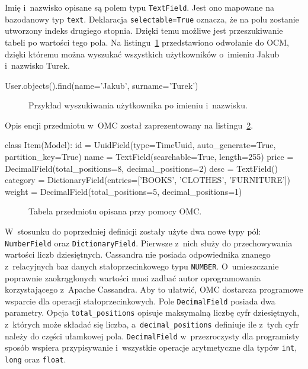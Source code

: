 Imię i~nazwisko opisane są polem typu \verb+TextField+. Jest ono mapowane na bazodanowy typ \verb+text+. Deklaracja \verb+selectable=True+ oznacza, że na polu zostanie utworzony indeks drugiego stopnia. Dzięki temu możliwe jest przeszukiwanie tabeli po wartości tego pola. Na listingu~\ref{lst:user_search_by_name_surname} przedstawiono odwołanie do OCM, dzięki któremu można wyszukać wszystkich użytkowników o~imieniu Jakub i~nazwisko Turek.

\begin{verbbox}[\footnotesize]
	User.objects().find(name='Jakub', surname='Turek')
\end{verbbox}

\begin{figure}[ht!]
	\centering
	\theverbbox
	\caption{Przykład wyszukiwania użytkownika po imieniu i~nazwisku.}
	\label{lst:user_search_by_name_surname}
\end{figure}

Opis encji przedmiotu w~OMC został zaprezentowany na listingu~\ref{lst:omc_item_definition}. 

\begin{verbbox}[\footnotesize]
class Item(Model):
    id = UuidField(type=TimeUuid, auto_generate=True, partition_key=True)
    name = TextField(searchable=True, length=255)
    price = DecimalField(total_positions=8, decimal_positions=2)
    desc = TextField()
    category = DictionaryField(entries=['BOOKS', 'CLOTHES', 'FURNITURE'])
    weight = DecimalField(total_positions=5, decimal_positions=1)
\end{verbbox}

\begin{figure}[ht!]
	\centering
	\theverbbox
	\caption{Tabela przedmiotu opisana przy pomocy OMC.}
	\label{lst:omc_item_definition}
\end{figure}

W~stosunku do poprzedniej definicji zostały użyte dwa nowe typy pól: \verb+NumberField+ oraz \verb+DictionaryField+. Pierwsze z~nich służy do przechowywania wartości liczb dziesiętnych. Cassandra nie posiada odpowiednika znanego z~relacyjnych baz danych stałoprzecinkowego typu \verb+NUMBER+. O~umieszczanie poprawnie zaokrąglonych wartości musi zadbać autor oprogramowania korzystającego z~Apache Cassandra. Aby to ułatwić, OMC dostarcza programowe wsparcie dla operacji stałoprzecinkowych. Pole \verb+DecimalField+ posiada dwa parametry. Opcja \verb+total_positions+ opisuje maksymalną liczbę cyfr dziesiętnych, z~których może składać się liczba, a~\verb+decimal_positions+ definiuje ile z~tych cyfr należy do części ułamkowej pola. \verb+DecimalField+ w~przezroczysty dla programisty sposób wspiera przypisywanie i~wszystkie operacje arytmetyczne dla typów \verb+int+, \verb+long+ oraz \verb+float+.

